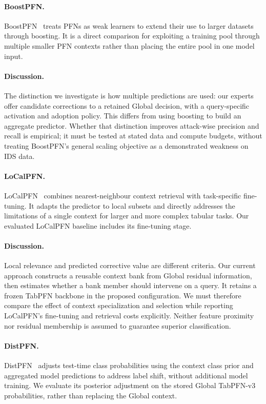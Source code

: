 \documentclass[sigconf,anonymous,pbalance]{acmart}
\begin{document}
\paragraph{BoostPFN.}
BoostPFN~\cite{wang2025boostpfn} treats PFNs as weak learners to extend their use to larger datasets through boosting. It is a direct comparison for exploiting a training pool through multiple smaller PFN contexts rather than placing the entire pool in one model input.

\paragraph{Discussion.}
The distinction we investigate is how multiple predictions are used: our experts offer candidate corrections to a retained Global decision, with a query-specific activation and adoption policy. This differs from using boosting to build an aggregate predictor. Whether that distinction improves attack-wise precision and recall is empirical; it must be tested at stated data and compute budgets, without treating BoostPFN's general scaling objective as a demonstrated weakness on IDS data.

\paragraph{LoCalPFN.}
LoCalPFN~\cite{thomas2024retrieval} combines nearest-neighbour context retrieval with task-specific fine-tuning. It adapts the predictor to local subsets and directly addresses the limitations of a single context for larger and more complex tabular tasks. Our evaluated LoCalPFN baseline includes its fine-tuning stage.

\paragraph{Discussion.}
Local relevance and predicted corrective value are different criteria. Our current approach constructs a reusable context bank from Global residual information, then estimates whether a bank member should intervene on a query. It retains a frozen TabPFN backbone in the proposed configuration. We must therefore compare the effect of context specialization and selection while reporting LoCalPFN's fine-tuning and retrieval costs explicitly. Neither feature proximity nor residual membership is assumed to guarantee superior classification.

\paragraph{DistPFN.}
DistPFN~\cite{lee2026distpfn} adjusts test-time class probabilities using the context class prior and aggregated model predictions to address label shift, without additional model training. We evaluate its posterior adjustment on the stored Global TabPFN-v3 probabilities, rather than replacing the Global context.
\end{document}
